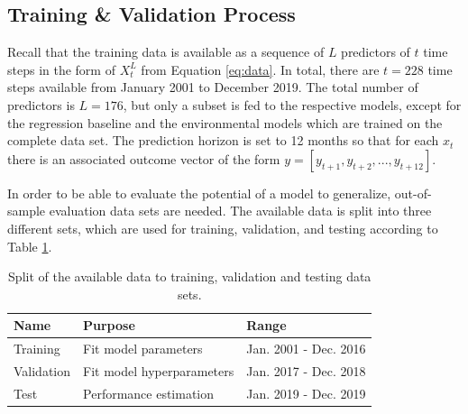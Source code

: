 \documentclass[a4paper,11pt]{article}
\begin{document}
\hypertarget{training-validation-process}{%
\subsection{Training \& Validation Process}\label{training-validation-process}}

Recall that the training data is available as a sequence of \(L\) predictors
of \(t\) time steps in the form of \(X^L_t\) from Equation \eqref{eq:data}. In total,
there are \(t = 228\) time steps available from January 2001 to December 2019.
The total number of predictors is \(L = 176\), but only a subset is fed to the respective models,
except for the regression baseline and the environmental models which are trained on
the complete data set. The prediction horizon is set to 12 months so that for
each \(x_t\) there is an associated outcome vector of the form \(y = [{y_{t+1},y_{t+2},...,y_{t+12}}]\).

In order to be able to evaluate the potential of a model to generalize, out-of-sample
evaluation data sets are needed. The available data is split into three different
sets, which are used for training, validation, and testing according to Table
\ref{tab:03-methods-split}.

\begingroup\fontsize{10}{12}\selectfont
\begingroup\fontsize{10}{12}\selectfont
\begin{longtable}[t]{lll}
\caption{\label{tab:03-methods-split}Split of the available data to training, validation and testing data sets.}\\
\toprule
Name & Purpose & Range\\
\midrule
Training & Fit model parameters & Jan. 2001 - Dec. 2016\\
Validation & Fit model hyperparameters & Jan. 2017 - Dec. 2018\\
Test & Performance estimation & Jan. 2019 - Dec. 2019\\
\bottomrule
\end{longtable}
\endgroup{}
\endgroup{}
\end{document}
